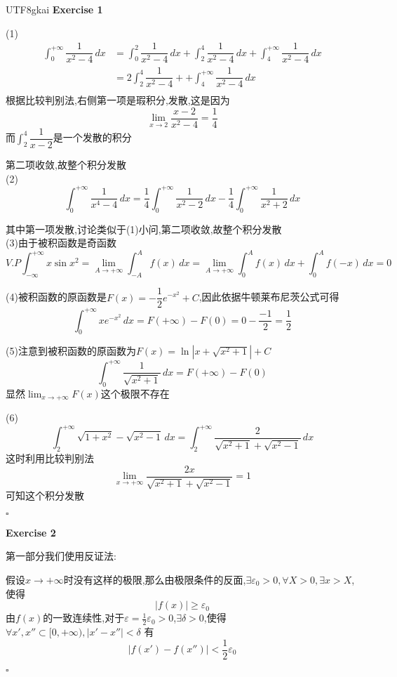 \documentclass{article}
\newenvironment{exercise}[1]{%
{\textbf{Exercise #1} \\ 
    }
}{
  \hfill $\square$ 
  \par\bigskip 
}
\newcommand{\abs}[1]{\left|#1\right|}
\begin{document}
\begin{CJK}{UTF8}{gkai}
\begin{exercise}{1}
    (1)
    \[\begin{aligned}
        \int_{0}^{+\infty}\dfrac{1}{x^2 - 4}\,dx &= \int_{0}^{2}\dfrac{1}{x^2 - 4} \,dx+ \int_{2}^{4}\dfrac{1}{x^2 - 4}\,dx + \int_{4}^{+\infty}\dfrac{1}{x^2 - 4}\,dx\\
        &= 2\int_{2}^{4}\dfrac{1}{x^2 - 4} + + \int_{4}^{+\infty}\dfrac{1}{x^2 - 4}\,dx\\
    \end{aligned}\]
    根据比较判别法,右侧第一项是瑕积分,发散,这是因为
    \[\lim_{x \to 2} \dfrac{x - 2}{x^2 - 4} = \dfrac{1}{4}\]
    而$\int_{2}^{4}\dfrac{1}{x - 2}$是一个发散的积分

    第二项收敛,故整个积分发散\\

    (2)
    \[\int_{0}^{+\infty}\dfrac{1}{x^4 - 4}\, dx =\dfrac{1}{4}\int_{0}^{+\infty}\dfrac{1}{x^2 - 2}\, dx - \dfrac{1}{4}\int_{0}^{+\infty}\dfrac{1}{x^2 + 2}\, dx\]

    其中第一项发散,讨论类似于(1)小问,第二项收敛,故整个积分发散\\

    (3)由于被积函数是奇函数
    \[V.P \int_{-\infty}^{+\infty} x \sin x^2 = \lim_{A \to +\infty} \int_{-A}^{A} f(x)\, dx = \lim_{A \to +\infty} \int_{0}^{A} f(x)\, dx + \int_{0}^{A} f(-x)\, dx = 0\]

    (4)被积函数的原函数是$F(x) = -\dfrac{1}{2}e^{-x^2} + C$,因此依据牛顿莱布尼茨公式可得
    \[\int_{0}^{ + \infty} xe^{-x^2} \, dx = F(+\infty) - F(0) = 0 - \dfrac{-1}{2} = \dfrac{1}{2}\]

    (5)注意到被积函数的原函数为$F(x) = \ln\abs{x + \sqrt{x^2 + 1}} + C$
    \[\int_{0}^{+\infty} \dfrac{1}{\sqrt{x^2 + 1}}\, dx = F(+\infty) - F(0) \]
    显然$\lim_{x\to +\infty}F(x)$这个极限不存在

    (6)
    \[\int_{2}^{+\infty} \sqrt{1 + x^2} - \sqrt{x^2 - 1}\, dx = \int_{2}^{+\infty} \dfrac{2}{\sqrt{x^2 + 1} + \sqrt{x^2 - 1}}\, dx\]
    这时利用比较判别法
    \[\lim_{x\to +\infty} \dfrac{2x}{\sqrt{x^2 + 1} + \sqrt{x^2 - 1}} = 1\]
    可知这个积分发散
\end{exercise}

\begin{exercise}{2}
    第一部分我们使用反证法:

    假设$x\to +\infty$时没有这样的极限,那么由极限条件的反面,$\exists \varepsilon_0 > 0,\forall X > 0,\exists x > X$,使得
    \[|f(x)| \geq \varepsilon_0\]
    由$f(x)$的一致连续性,对于$\varepsilon = \frac{1}{2}\varepsilon_0 > 0$,$\exists \delta >0$,使得$\forall x',x''  \subset [0,+\infty),|x' - x''| < \delta$ 有
    \[|f(x') - f(x'')| < \frac{1}{2}\varepsilon_0\]


\end{exercise}
\end{CJK}
\end{document}
